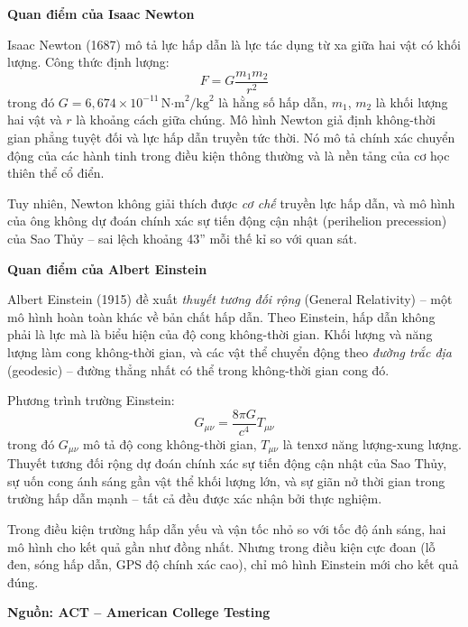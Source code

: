 \documentclass[12pt,a4paper,twoside]{article}
\newenvironment{readingpassage}[1][]{%
    \begin{tcolorbox}[enhanced, colback=grayLight, colframe=secondaryBlue,
        coltitle=textDark, fonttitle=\bfseries, title={#1},
        rounded corners, arc=3mm, boxrule=1pt,
        left=15pt, right=15pt, top=10pt, bottom=10pt,
        breakable, before skip=10pt, after skip=10pt, drop fuzzy shadow]
    \setstretch{1.3}
}{\end{tcolorbox}}
\begin{document}
\begin{readingpassage}
\textbf{Quan điểm của Isaac Newton}

Isaac Newton (1687) mô tả lực hấp dẫn là lực tác dụng từ xa giữa hai vật có khối lượng. Công thức định lượng:
$$F = G\frac{m_1 m_2}{r^2}$$
trong đó $G = 6{,}674 \times 10^{-11}\,\text{N·m}^2/\text{kg}^2$ là hằng số hấp dẫn, $m_1$, $m_2$ là khối lượng hai vật và $r$ là khoảng cách giữa chúng. Mô hình Newton giả định không-thời gian phẳng tuyệt đối và lực hấp dẫn truyền tức thời. Nó mô tả chính xác chuyển động của các hành tinh trong điều kiện thông thường và là nền tảng của cơ học thiên thể cổ điển.

Tuy nhiên, Newton không giải thích được \textit{cơ chế} truyền lực hấp dẫn, và mô hình của ông không dự đoán chính xác sự tiến động cận nhật (perihelion precession) của Sao Thủy -- sai lệch khoảng 43'' mỗi thế kỉ so với quan sát.

\textbf{Quan điểm của Albert Einstein}

Albert Einstein (1915) đề xuất \textit{thuyết tương đối rộng} (General Relativity) -- một mô hình hoàn toàn khác về bản chất hấp dẫn. Theo Einstein, hấp dẫn không phải là lực mà là biểu hiện của độ cong không-thời gian. Khối lượng và năng lượng làm cong không-thời gian, và các vật thể chuyển động theo \textit{đường trắc địa} (geodesic) -- đường thẳng nhất có thể trong không-thời gian cong đó.

Phương trình trường Einstein:
$$G_{\mu\nu} = \frac{8\pi G}{c^4} T_{\mu\nu}$$
trong đó $G_{\mu\nu}$ mô tả độ cong không-thời gian, $T_{\mu\nu}$ là tenxơ năng lượng-xung lượng. Thuyết tương đối rộng dự đoán chính xác sự tiến động cận nhật của Sao Thủy, sự uốn cong ánh sáng gần vật thể khối lượng lớn, và sự giãn nở thời gian trong trường hấp dẫn mạnh -- tất cả đều được xác nhận bởi thực nghiệm.

Trong điều kiện trường hấp dẫn yếu và vận tốc nhỏ so với tốc độ ánh sáng, hai mô hình cho kết quả gần như đồng nhất. Nhưng trong điều kiện cực đoan (lỗ đen, sóng hấp dẫn, GPS độ chính xác cao), chỉ mô hình Einstein mới cho kết quả đúng.

\hfill\textbf{Nguồn: ACT -- American College Testing}
\end{readingpassage}
\end{document}
